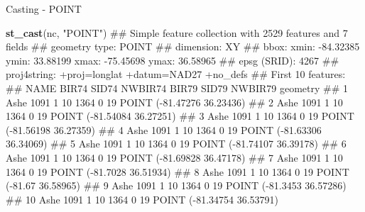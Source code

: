\documentclass[11pt,ignorenonframetext,]{beamer}
\newenvironment{Shaded}{}{}
\newcommand{\KeywordTok}[1]{\textcolor[rgb]{0.00,0.44,0.13}{\textbf{#1}}}
\newcommand{\NormalTok}[1]{#1}
\newcommand{\StringTok}[1]{\textcolor[rgb]{0.25,0.44,0.63}{#1}}
\let\oldShaded\Shaded
\let\endoldShaded\endShaded
\renewenvironment{Shaded}{\footnotesize\begin{spacing}{0.9}\oldShaded}{\endoldShaded\end{spacing}}
\let\oldverbatim\verbatim
\let\endoldverbatim\endverbatim
\newcommand{\scriptoutput}{
  \renewenvironment{Shaded}{\scriptsize\begin{spacing}{0.9}\oldShaded}{\endoldShaded\end{spacing}}
  \renewenvironment{verbatim}{\scriptsize\begin{spacing}{0.9}\oldverbatim}{\endoldverbatim\end{spacing}}
}
\begin{document}
\begin{frame}[fragile,t]{Casting - POINT}
\protect\hypertarget{casting---point}{}

\scriptoutput

\begin{Shaded}
\begin{Highlighting}[]
\KeywordTok{st_cast}\NormalTok{(nc, }\StringTok{"POINT"}\NormalTok{)}
\NormalTok{## Simple feature collection with 2529 features and 7 fields}
\NormalTok{## geometry type:  POINT}
\NormalTok{## dimension:      XY}
\NormalTok{## bbox:           xmin: -84.32385 ymin: 33.88199 xmax: -75.45698 ymax: 36.58965}
\NormalTok{## epsg (SRID):    4267}
\NormalTok{## proj4string:    +proj=longlat +datum=NAD27 +no_defs}
\NormalTok{## First 10 features:}
\NormalTok{##    NAME BIR74 SID74 NWBIR74 BIR79 SID79 NWBIR79                   geometry}
\NormalTok{## 1  Ashe  1091     1      10  1364     0      19 POINT (-81.47276 36.23436)}
\NormalTok{## 2  Ashe  1091     1      10  1364     0      19 POINT (-81.54084 36.27251)}
\NormalTok{## 3  Ashe  1091     1      10  1364     0      19 POINT (-81.56198 36.27359)}
\NormalTok{## 4  Ashe  1091     1      10  1364     0      19 POINT (-81.63306 36.34069)}
\NormalTok{## 5  Ashe  1091     1      10  1364     0      19 POINT (-81.74107 36.39178)}
\NormalTok{## 6  Ashe  1091     1      10  1364     0      19 POINT (-81.69828 36.47178)}
\NormalTok{## 7  Ashe  1091     1      10  1364     0      19  POINT (-81.7028 36.51934)}
\NormalTok{## 8  Ashe  1091     1      10  1364     0      19    POINT (-81.67 36.58965)}
\NormalTok{## 9  Ashe  1091     1      10  1364     0      19  POINT (-81.3453 36.57286)}
\NormalTok{## 10 Ashe  1091     1      10  1364     0      19 POINT (-81.34754 36.53791)}
\end{Highlighting}
\end{Shaded}

\end{frame}
\end{document}
